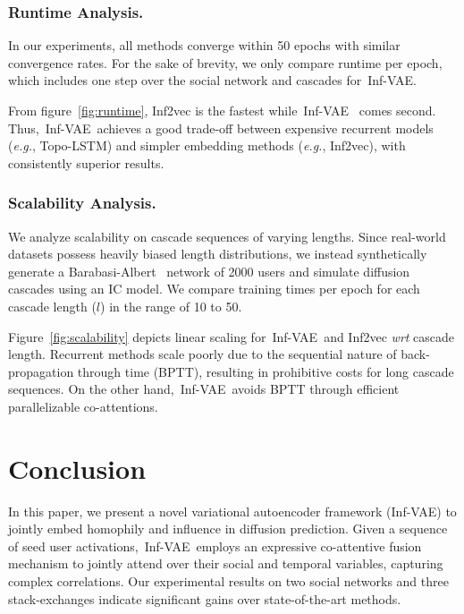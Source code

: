 \documentclass[sigconf]{acmart}
\newcommand{\name}{Inf-VAE}
\begin{document}
\subsubsection{\textbf{Runtime Analysis}.} 
In our experiments, all methods converge within 50 epochs with similar convergence rates.
For the sake of brevity, we only compare runtime per epoch, which includes one step over the social network and cascades for~\name.

From figure~\ref{fig:runtime}, Inf2vec is the fastest while~\name~ comes second.
Thus,~\name~achieves a good trade-off between 
expensive recurrent models (\textit{e.g.}, Topo-LSTM) and simpler embedding methods (\textit{e.g.}, Inf2vec), with consistently superior results.
\subsubsection{\textbf{Scalability Analysis}.} We analyze scalability on cascade sequences of varying lengths.
Since real-world datasets possess heavily biased length distributions, we instead 
synthetically generate a 
Barabasi-Albert~\cite{barabasi} network of 2000 users and simulate diffusion cascades using an IC model.
We compare training times per epoch for each cascade length ($l$) in the range of 10 to 50.

Figure~\ref{fig:scalability} depicts
linear scaling for~\name~and Inf2vec \textit{wrt} cascade length.
Recurrent methods scale poorly due to the  sequential nature of back-propagation through time (BPTT), resulting in prohibitive costs for long cascade sequences.
On the other hand,~\name~avoids BPTT through efficient parallelizable co-attentions.




















\section{Conclusion}
In this paper, we present a novel variational autoencoder framework (\name) to jointly embed homophily and influence in diffusion prediction.
Given a sequence of seed user activations,~\name~employs an expressive co-attentive fusion mechanism to jointly attend over their social and temporal variables, capturing complex correlations.
Our experimental results on two social networks and three stack-exchanges indicate significant gains over state-of-the-art methods.
\end{document}
